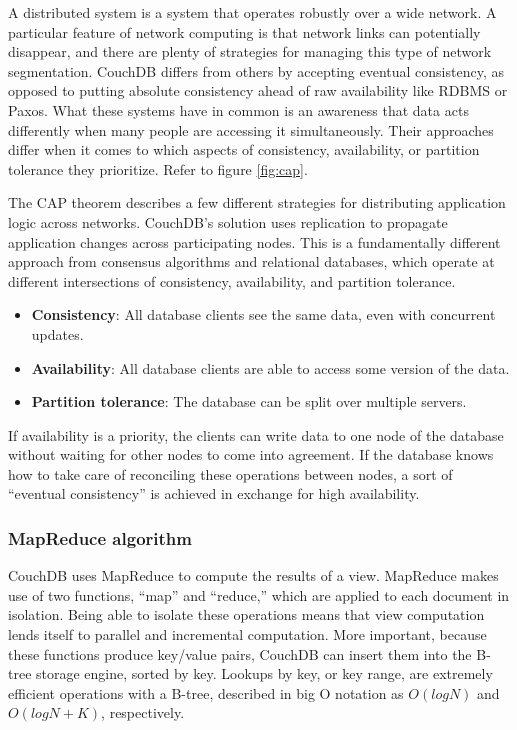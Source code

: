 A distributed system is a system that operates robustly over a wide network. 
A particular feature of network computing is that network links can potentially disappear, and there are plenty of strategies for managing this type of network segmentation. CouchDB differs from others by accepting eventual consistency, 
as opposed to putting absolute consistency ahead of raw availability like 
RDBMS or Paxos. What these systems have in common is an awareness that data acts differently when many people are accessing it simultaneously. 
Their approaches differ when it comes to which aspects of consistency, 
availability, or partition tolerance they prioritize. Refer to figure \ref{fig:cap}.

The CAP theorem describes a few different strategies for distributing application logic across networks. CouchDB’s solution uses replication to propagate application changes across participating nodes. This is a fundamentally different approach from 
consensus algorithms and relational databases, which operate at different intersections 
of consistency, availability, and partition tolerance.

\begin{itemize}
    \item \textbf{Consistency}: All database clients see the same data, even with concurrent updates.
    \item \textbf{Availability}: All database clients are able to access some version of the data.
    \item \textbf{Partition tolerance}: The database can be split over multiple servers.
\end{itemize}

If availability is a priority, the clients can write data to one node of the database without waiting for other nodes to come into agreement. If the database 
knows how to take care of reconciling these operations between nodes, 
a sort of “eventual consistency” is achieved in exchange for high availability.

\subsubsection{MapReduce algorithm}

CouchDB uses MapReduce to compute the results of a view. MapReduce makes use of two functions, “map” and “reduce,” which are applied to each document in isolation. 
Being able to isolate these operations means that view computation lends itself to parallel and incremental computation. More important, because these functions produce key/value pairs, CouchDB can insert them into the B-tree storage engine, 
sorted by key. Lookups by key, or key range, are extremely efficient operations with a 
B-tree, described in big O notation as $O(log N)$ and $O(log N + K)$, respectively.~\cite{CouchDB}
